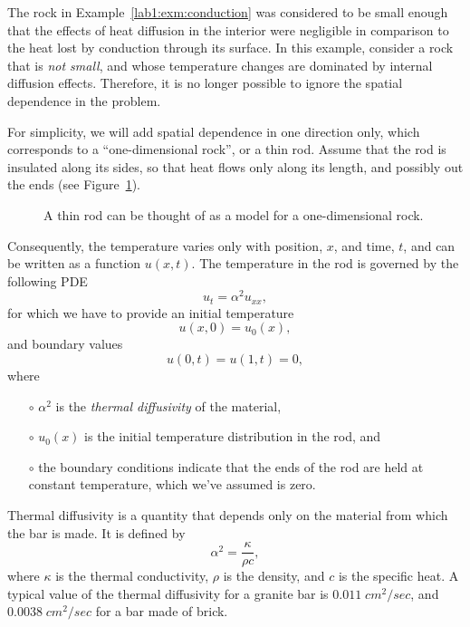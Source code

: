 \begin{example}
  \label{lab1:exm:diffusion1d}
  The rock in Example~\ref{lab1:exm:conduction} was considered to be small
  enough that the effects of heat diffusion in the interior
  were negligible in comparison to the heat lost by conduction
  through its surface.  
  In this example, consider a rock that is \emph{not small}, and whose
  temperature changes are dominated by internal diffusion effects.
  Therefore, it is no longer possible to ignore the spatial dependence
  in the problem.  

  For simplicity, we will add spatial dependence in one direction
  only, which corresponds to a ``one-dimensional rock'', or a thin
  rod.  Assume that the rod is insulated along its sides, so that heat
  flows only along its length, and possibly out the ends (see
  Figure~\ref{lab1:fig:rock-1d}).
  \begin{figure}[htbp]
    \begin{center}
      \leavevmode
      \caption{A thin rod can be thought of as a model for a
        one-dimensional rock.} 
      \label{lab1:fig:rock-1d}
    \end{center}
  \end{figure}
  Consequently, the temperature varies only with position, $x$, and
  time, $t$,
  and can be written as a function $u(x,t)$.   
  The temperature in the rod is governed by the following PDE
  \[
    u_t = \alpha^2 u_{xx},
  \]
  for which we have to provide an initial temperature 
  \[ 
    u(x,0) = u_0(x),
  \]
  and boundary values
  \[
    u(0,t)=u(1,t)=0,
  \]
  where 
  \begin{itemize}
  \item[$\circ$] $\alpha^2$ is the \emph{thermal diffusivity} of the
    material, 
  \item[$\circ$] $u_0(x)$ is the initial temperature distribution in the
    rod,  and
  \item[$\circ$] the boundary conditions indicate that the ends of the rod
    are held at constant temperature, which we've assumed is zero.
  \end{itemize}

  Thermal diffusivity is a quantity that depends only on the
  material from which the bar is made.  It is defined by 
  \[
  \alpha^2 = \frac{\kappa}{\rho c},
  \]
  where $\kappa$ is the thermal conductivity, $\rho$ is the density,
  and $c$ is the specific heat.  A typical value of the thermal
  diffusivity for a granite 
  bar is $0.011\;cm^2/sec$, and $0.0038\;cm^2/sec$ for a bar made of
  brick.  


\end{example}
